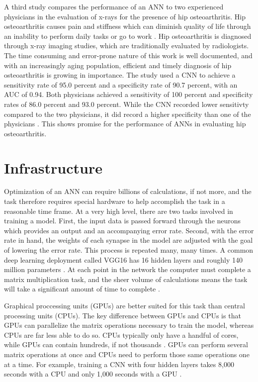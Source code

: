 \documentclass[sigconf]{acmart}
\begin{document}
A third study compares the performance of an ANN to two experienced physicians in the evaluation of x-rays for the presence of hip osteoarthritis. Hip osteoarthritis causes pain and stiffness which can diminish quality of life through an inability to perform daily tasks or go to work \cite{cite12}. Hip osteoarthritis is diagnosed through x-ray imaging studies, which are traditionally evaluated by radiologists. The time consuming and error-prone nature of this work is well documented, and with an increasingly aging population, efficient and timely diagnosis of hip osteoarthritis is growing in importance. The study used a CNN to achieve a sensitivity rate of 95.0 percent and a specificity rate of 90.7 percent, with an AUC of 0.94. Both physicians achieved a sensitivity of 100 percent and specificity rates of 86.0 percent and 93.0 percent. While the CNN recorded lower sensitivty compared to the two physicians, it did record a higher specificity than one of the physicians \cite{cite12}. This shows promise for the performance of ANNs in evaluating hip osteoarthritis.

\section{Infrastructure}

Optimization of an ANN can require billions of calculations, if not more, and the task therefore requires special hardware to help accomplish the task in a reasonable time frame. At a very high level, there are two tasks involved in training a model. First, the input data is passed forward through the neurons which provides an output and an accompanying error rate. Second, with the error rate in hand, the weights of each synapse in the model are adjusted with the goal of lowering the error rate. This process is repeated many, many times. A common deep learning deployment called VGG16 has 16 hidden layers and roughly 140 million parameters \cite{cite14}. At each point in the network the computer must complete a matrix multiplication task, and the sheer volume of calculations means the task will take a significant amount of time to complete \cite{cite14}\cite{cite13}.

Graphical proccessing units (GPUs) are better suited for this task than central processing units (CPUs). The key difference between GPUs and CPUs is that GPUs can parallelize the matrix operations necessary to train the model, whereas CPUs are far less able to do so. CPUs typically only have a handful of cores, while GPUs can contain hundreds, if not thousands \cite{cite13}. GPUs can perform several matrix operations at once and CPUs need to perform those same operations one at a time. For example, training a CNN with four hidden layers takes 8,000 seconds with a CPU and only 1,000 seconds with a GPU \cite{cite13}.
\end{document}
